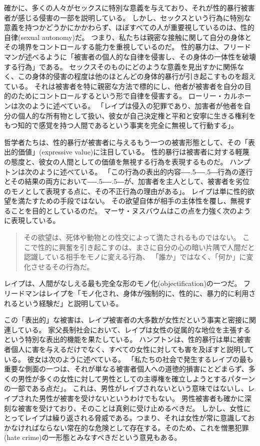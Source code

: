 \documentclass[paper=a4,book,openany]{jlreq}
\newcommand{\ig}[1]{}           %
\def\DDASH{―\kern-.5\zw―\kern-.5\zw―} %
\begin{document}
確かに、多くの人々がセックスに特別な意義を与えており、それが性的暴行被害者が感じる侵害の一部を説明している。
しかし、セックスという行為に特別な意義を持つかどうかにかかわらず、ほぼすべての人が重要視しているのは、性的自律(sexual autonomy)だ。
つまり、私たちは親密な接触に関して自分の身体とその境界をコントロールする能力を重視しているのだ。
性的暴力は、フリードマン\ig{Karyn L. Freedman}が述べるように「被害者の個人的な自律を侵害し、その身体の一体性を破壊する行為」である。
セックスそのものにどのような意義を見出すかに関係なく、この身体的侵害の程度は他のほとんどの身体的暴行が引き起こすものを超えている。
それは被害者を特に親密な方法で標的にし、他者が被害者を自分の目的のためにコントロールするという形で自律を侵害する。
ローリー・カルホーンは次のように述べている。
「レイプは侵入の犯罪であり、加害者が他者を自分の個人的な所有物として扱い、彼女が自己決定権と平和と安寧に生きる権利をもつ知的で感覚を持つ人間であるという事実を完全に無視して行動する」\citep[p.109]{calhoun97:_rape}。

哲学者たちは、性的暴行が被害者に与えるもう一つの被害形態として、その「表出的価値」(expressive value)に注目している。
性的暴行は被害者に対する軽蔑の態度と、彼女の人間としての価値を無視する行為を表現するものだ。
ハンプトンは次のように述べている。
「この行為の表出的内容{\DDASH}行為の遂行とその結果の両方において{\DDASH}が、加害者を主人として、被害者を劣位のモノとして表現する点に、その不正行為の理由がある」\citep[p.135]{hampton99:_defin_wrong_and_defin_rape}。
レイプは単に性的欲望を満たすための手段ではない。
その欲望自体が相手の主体性を覆し、無視することを目的としているのだ。
マーサ・ヌスバウムはこの点を力強く次のように表現している。

\begin{quote}
その欲望は、死体や動物との性交によって満たされるものではない。
ここで性的に興奮を引き起こすのは、まさに自分の心の暗い片隅で人間だと認識している相手をモノに変える行為、
「誰か」ではなく、「何か」に変化させるその行為だ。
\citep[p.281]{nussbaum95:_objec}
\end{quote}

レイプは、人間がなしえる最も完全な形のモノ化(objectification)の一つだ。
フリードマン\ig{Karyn L. Freedman}はレイプを「モノ化され、身体が強制的に、性的に、暴力的に利用されるという経験だ」と説明している。

この「表出的」な被害は、レイプ被害者の大多数が女性だという事実と密接に関連している。
家父長制社会において、レイプは女性の従属的な地位を主張するという特別な表出的機能を果たしている。
ハンプトンは、性的暴行は単に被害者個人に害を与えるだけでなく、すべての女性に対しても害を及ぼすと説明している。
彼女は次のように述べている。
「私たちの社会で発生するレイプの最も重要な側面の一つは、それが単なる被害者個人への道徳的損害にとどまらず、多くの男性が多くの女性に対して男性としての主導権を確立しようとするパターンの一部である点だ」\citep[p.135]{hampton99:_defin_wrong_and_defin_rape}。
これは、男性がレイプされないという意味ではないし、レイプされた男性が被害を受けないというわけでもない。
男性被害者も確かに深刻な被害を受けており、そのことは真剣に受け止めるべきだ。
しかし、女性にとってレイプは繰り返される脅威である。つまり、それは女性が常に意識しておかなければならない常在的な危険として存在する。そのため、これを憎悪犯罪(hate crime)の一形態とみなすべきだという意見もある\citep{campo-engelstein16:_rape_hate_crime}。
\end{document}

